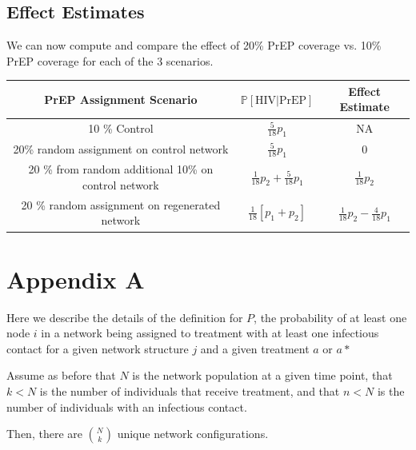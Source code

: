 \documentclass{article}
\theoremstyle{definition}
\begin{document}
\subsection{Effect Estimates}
We can now compute and compare the effect of 20\% PrEP coverage vs. 10\% PrEP coverage for each of the 3 scenarios.
\begin{center}
    \begin{tabular}{|c|c|c|}
    \hline
    PrEP Assignment Scenario     & $\mathbb{P}\left[\text{HIV} \vert \text{PrEP}\right]$ &  Effect Estimate  \\
         \hline
      10 \% Control   & $\frac{5}{18}p_{1}$ & NA\\
      \hline
      20\% random assignment on control network & $\frac{5}{18}p_{1}$ & 0 \\
      \hline
      20 \% from random additional 10\% on control network & $\frac{1}{18}p_{2}+\frac{5}{18}p_{1}$ & $\frac{1}{18}p_{2}$\\
      \hline
      20 \% random assignment on regenerated network & $\frac{1}{18}\left[p_{1}+p_{2}\right]$ & $\frac{1}{18}p_{2}-\frac{4}{18}p_{1}$\\
      \hline                 
    \end{tabular}                                      \end{center}
\section{Appendix A}
Here we describe the details of the definition for $P$, the probability of at least one node $i$ in a network being assigned to treatment with at least one infectious contact for a given network structure $j$ and a given treatment $a$ or $a*$

Assume as before that $N$ is the network population at a given time point, that $k<N$ is the number of individuals that receive treatment, and that $n<N$ is the number of individuals with an infectious contact.

 Then, there are $N \choose k$ unique network configurations.
 
\end{document}

